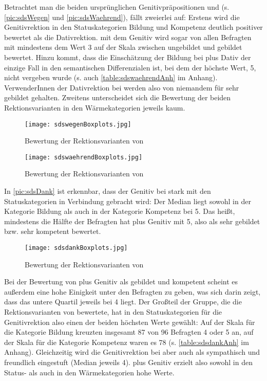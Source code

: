 Betrachtet man die beiden ursprünglichen Genitivpräpositionen \wegen{} und \waehrend{} (s. \autoref{pic:sdsWegen} und \autoref{pic:sdsWaehrend}), fällt zweierlei auf: 
Erstens wird die Genitivrektion in den Statuskategorien \glqq Bildung\grqq{} und \glqq Kompetenz\grqq{} deutlich positiver bewertet als die Dativrektion. 
 mit dem Genitiv wird sogar von allen Befragten mit mindestens dem Wert 3 auf der Skala zwischen ungebildet und gebildet bewertet. 
Hinzu kommt, dass die Einschätzung der Bildung bei \waehrend{} plus Dativ der einzige Fall in den semantischen Differenzialen ist, bei dem der höchste Wert, 5, nicht vergeben wurde (s. auch \autoref{table:sdswaehrendAnh} im Anhang). 
VerwenderInnen der Dativrektion bei \waehrend{} werden also von niemandem für sehr gebildet gehalten. 
Zweitens unterscheidet sich die Bewertung der beiden Rektionsvarianten in den Wärmekategorien jeweils kaum.
\begin{figure}
\centering
\texttt{[image: sdswegenBoxplots.jpg]}
\caption{Bewertung der Rektionsvarianten von \wegen}
\label{pic:sdsWegen}
\end{figure}
\begin{figure}
\centering
\texttt{[image: sdswaehrendBoxplots.jpg]}
\caption{Bewertung der Rektionsvarianten von \waehrend}
\label{pic:sdsWaehrend}
\end{figure}
 
In \autoref{pic:sdsDank} ist erkennbar, dass der Genitiv bei \dank{} stark mit den Statuskategorien in Verbindung gebracht wird: 
Der Median liegt sowohl in der Kategorie \glqq Bildung\grqq{} als auch in der Kategorie \glqq Kompetenz\grqq{} bei 5.
Das heißt, mindestens die Hälfte der Befragten hat \dank{} plus Genitiv mit 5, also als sehr gebildet bzw. sehr kompetent bewertet.
\begin{figure}
\centering
\texttt{[image: sdsdankBoxplots.jpg]}
\caption{Bewertung der Rektionsvarianten von \dank}
\label{pic:sdsDank}
\end{figure}

Bei der Bewertung von \dank{} plus Genitiv als gebildet und kompetent scheint es außerdem eine hohe Einigkeit unter den Befragten zu geben, was sich darin zeigt, dass das untere Quartil jeweils bei 4 liegt. 
Der Großteil der Gruppe, die die Rektionsvarianten von \dank{} bewertete, hat in den Statuskategorien für die Genitivrektion also einen der beiden höchsten Werte gewählt: 
Auf der Skala für die Kategorie Bildung kreuzten insgesamt 87 von 96 Befragten 4 oder 5 an, auf der Skala für die Kategorie Kompetenz waren es 78 (s. \autoref{table:sdsdankAnh} im Anhang). 
Gleichzeitig wird die Genitivrektion bei \dank{} aber auch als sympathisch und freundlich eingestuft (Median jeweils 4). 
 plus Genitiv erzielt also sowohl in den Status- als auch in den Wärmekategorien hohe Werte. 

